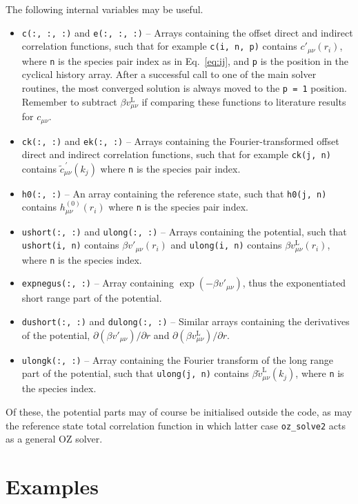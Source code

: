 \documentclass[12pt,a4paper]{article}
\newcommand{\lr}{^{\mathrm{L}}}
\newcommand{\myprime}{^{{}\,\prime}}
\newcommand{\href}{h^{(0)}}
\newcommand{\Eqref}[1]{Eq.~\eqref{#1}}
\begin{document}
The following internal variables may be useful.
%
\begin{itemize}
%
\item\verb+c(:, :, :)+ and \verb+e(:, :, :)+ -- Arrays containing the
  offset direct and indirect correlation functions, such that for
  example \verb+c(i, n, p)+ contains $c'_{\mu\nu}(r_i)$, where
  \verb+n+ is the species pair index as in \Eqref{eq:ij}, and \verb+p+
  is the position in the cyclical history array.  After a successful
  call to one of the main solver routines, the most converged solution
  is always moved to the \verb+p = 1+ position.  Remember to subtract
  $\beta v\lr_{\mu\nu}$ if comparing these functions to literature results
  for $c_{\mu\nu}$.
%
\item\verb+ck(:, :)+ and \verb+ek(:, :)+ -- Arrays containing the
  Fourier-transformed offset direct and indirect correlation
  functions, such that for example \verb+ck(j, n)+ contains ${\tilde
    c}_{\mu\nu}\myprime(k_j)$ where \verb+n+ is the species pair
  index.
%
\item\verb+h0(:, :)+ -- An array containing the reference state, such
  that \verb+h0(j, n)+ contains $\href_{\mu\nu}(r_i)$ where
  \verb+n+ is the species pair index. 
%
\item\verb+ushort(:, :)+ and \verb+ulong(:, :)+ -- Arrays containing
  the potential, such that \verb+ushort(i, n)+ contains $\beta
  v'_{\mu\nu}(r_i)$ and \verb+ulong(i, n)+ contains $\beta
  v\lr_{\mu\nu}(r_i)$, where \verb+n+ is the species index.
%
\item\verb+expnegus(:, :)+ -- Array containing $\exp(-\beta
  v'_{\mu\nu})$, thus the exponentiated short range part of the
  potential.
%
\item\verb+dushort(:, :)+ and \verb+dulong(:, :)+ -- Similar arrays
  containing the derivatives of the potential, $\partial(\beta
  v'_{\mu\nu})/\partial r$ and $\partial(\beta v\lr_{\mu\nu})/\partial
  r$.
%
\item\verb+ulongk(:, :)+ -- Array containing the Fourier transform of
  the long range part of the potential, such that \verb+ulong(j, n)+
  contains $\beta{\tilde v}\lr_{\mu\nu}(k_j)$, where \verb+n+ is the
  species index.
%
\end{itemize}
%
Of these, the potential parts may of course be initialised outside the
code, as may the reference state total correlation function in which
latter case \verb+oz_solve2+ acts as a general OZ solver.

\section{Examples}
%
\end{document}
